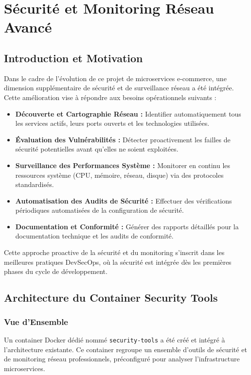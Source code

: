 
\chapter{Sécurité et Monitoring Réseau Avancé}

\section{Introduction et Motivation}
Dans le cadre de l'évolution de ce projet de microservices e-commerce, une dimension supplémentaire de sécurité et de surveillance réseau a été intégrée. Cette amélioration vise à répondre aux besoins opérationnels suivants :

\begin{itemize}
    \item \textbf{Découverte et Cartographie Réseau :} Identifier automatiquement tous les services actifs, leurs ports ouverts et les technologies utilisées.
    \item \textbf{Évaluation des Vulnérabilités :} Détecter proactivement les failles de sécurité potentielles avant qu'elles ne soient exploitées.
    \item \textbf{Surveillance des Performances Système :} Monitorer en continu les ressources système (CPU, mémoire, réseau, disque) via des protocoles standardisés.
    \item \textbf{Automatisation des Audits de Sécurité :} Effectuer des vérifications périodiques automatisées de la configuration de sécurité.
    \item \textbf{Documentation et Conformité :} Générer des rapports détaillés pour la documentation technique et les audits de conformité.
\end{itemize}

Cette approche proactive de la sécurité et du monitoring s'inscrit dans les meilleures pratiques DevSecOps, où la sécurité est intégrée dès les premières phases du cycle de développement.

\section{Architecture du Container Security Tools}

\subsection{Vue d'Ensemble}
Un container Docker dédié nommé \texttt{security-tools} a été créé et intégré à l'architecture existante. Ce container regroupe un ensemble d'outils de sécurité et de monitoring réseau professionnels, préconfiguré pour analyser l'infrastructure microservices.

